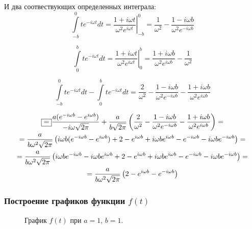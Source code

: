 \documentclass[a5paper, 10pt]{article}
\theoremstyle{definition}
\theoremstyle{plain}
\theoremstyle{remark}
\begin{document}
И два соотвествующих определенных интеграла:
\begin{equation}
\int \limits_{-b}^{0}  t e^{-i \omega t} dt =  \left. \frac{1 + i \omega t}{\omega^2 e^{i \omega t}} \right|^0_{-b} =  \frac{1}{\omega^2} -
 \frac{1 - i \omega b}{\omega^2 e^{-i \omega b}}
\end{equation}

\begin{equation}
\int \limits_{0}^{b}  t e^{-i \omega t} dt =  \left. \frac{1 + i \omega t}{\omega^2 e^{i \omega t}} \right|^b_{0} =
 \frac{1 + i \omega b}{\omega^2 e^{i \omega b}} -\frac{1}{\omega^2} 
\end{equation}

\begin{equation}
\int \limits_{-b}^{0}  t e^{-i \omega t} dt -  \int \limits_{0}^{b}  t e^{-i \omega t} dt  =  \frac{2}{\omega^2} -
 \frac{1 - i \omega b}{\omega^2 e^{-i \omega b}} - \frac{1 + i \omega b}{\omega^2 e^{i \omega b}} 
\end{equation}

\begin{multline}
\fbox{=} \frac{a ( e^{-i \omega b} -  e^{i \omega b})}{-i\omega \sqrt{2 \pi}} + \frac{a}{b\sqrt{2 \pi}} \left( \frac{2}{\omega^2} -
 \frac{1 - i \omega b}{\omega^2 e^{-i \omega b}} - \frac{1 + i \omega b}{\omega^2 e^{i \omega b}}  \right) =\\
=\frac{a}{b \omega^2 \sqrt{2 \pi}} \left( i\omega b (e^{-i \omega b} - e^{i \omega b}) + 2 - e^{i\omega b} + i \omega b e^{i\omega b} - e^{-i\omega b} - i \omega b e^{-i\omega b} \right) = \\
= \frac{a}{b \omega^2 \sqrt{2 \pi}} \left( i\omega b e^{-i \omega b} - i\omega b e^{i \omega b} + 2 - e^{i\omega b} + i \omega b e^{i\omega b} - e^{-i\omega b} - i \omega b e^{-i\omega b} \right) = \\
= \frac{a}{b \omega^2 \sqrt{2 \pi}} \left( 2 - e^{i\omega b}  - e^{-i\omega b} \right) 
\end{multline}


\subsubsection{Построение графиков функции $f(t)$}

\begin{figure}[h!]
\caption{График $f(t)$ при $a = 1$, $b = 1$.}
\end{figure}
\end{document}
